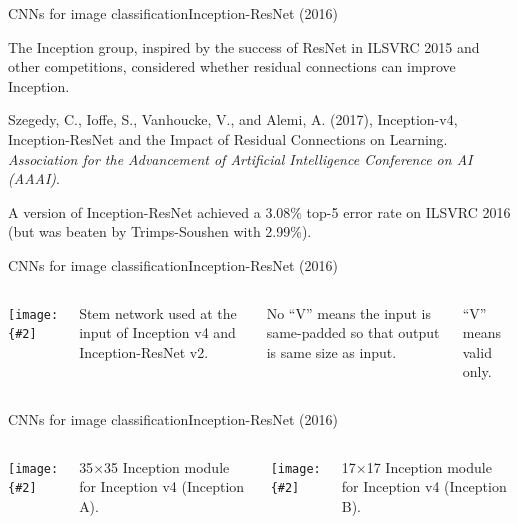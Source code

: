 \documentclass{beamer}
\newcommand{\myfig}[3]{\centerline{\texttt{[image: \{\#2]}}}
\begin{document}
\begin{frame}{CNNs for image classification}{Inception-ResNet (2016)}

  The Inception group, inspired by the success of ResNet in ILSVRC 2015 and
  other competitions, considered whether residual connections can improve
  Inception.

  \medskip
  
  Szegedy, C., Ioffe, S., Vanhoucke, V., and Alemi, A. (2017),
  Inception-v4, Inception-ResNet and the Impact of Residual
  Connections on Learning. \textit{Association for the Advancement
    of Artificial Intelligence Conference on AI (AAAI)}.

  \medskip

  A version of Inception-ResNet achieved a 3.08\% top-5 error rate on
  ILSVRC 2016 (but was beaten by Trimps-Soushen with 2.99\%).

\end{frame}


\begin{frame}{CNNs for image classification}{Inception-ResNet (2016)}

  \begin{columns}
    
    \column{1.5in}

    \myfig{1in}{szegedy-16-fig3}{Szegedy et at.\ (2017), Fig.\ 3}

    \column{3in}

    Stem network used at the input of Inception v4 and
    Inception-ResNet v2.

    \medskip

    No ``V'' means the input is same-padded so that output is same
    size as input.

    \medskip

    ``V'' means valid only.
    
  \end{columns}
  
\end{frame}


\begin{frame}{CNNs for image classification}{Inception-ResNet (2016)}

  \begin{columns}

    \column{2.2in}
    
    \myfig{2in}{szegedy-16-fig4}{Szegedy et at.\ (2017), Fig.\ 4}

    \medskip

    35$\times$35 Inception module for Inception v4 (Inception A).

    \column{2.2in}
    
    \myfig{2in}{szegedy-16-fig5}{Szegedy et at.\ (2017), Fig.\ 5}

    \medskip

    17$\times$17 Inception module for Inception v4 (Inception B).

    \end{columns}

\end{frame}
\end{document}
